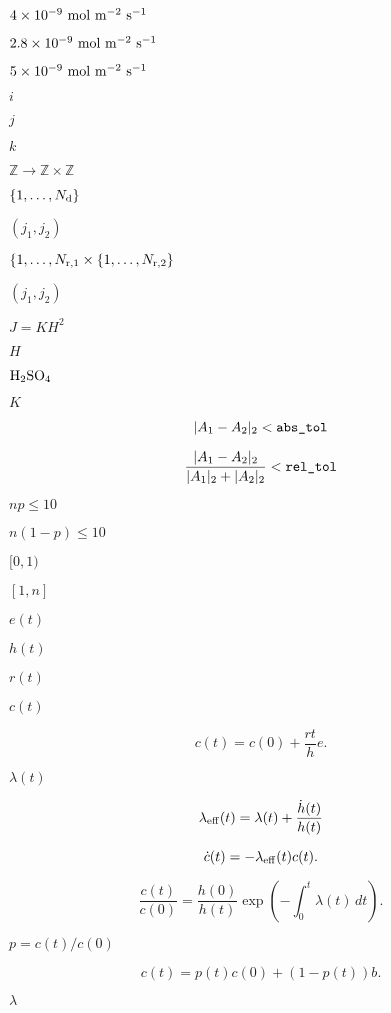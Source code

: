 \documentclass{article}
\begin{document}
$4\times
 10^{-9}\rm\ mol\ m^{-2}\ s^{-1}$
\pagebreak

$2.8\times
 10^{-9}\rm\ mol\ m^{-2}\ s^{-1}$
\pagebreak

$5\times
 10^{-9}\rm\ mol\ m^{-2}\ s^{-1}$
\pagebreak

$i$
\pagebreak

$j$
\pagebreak

$k$
\pagebreak

$\mathbb{Z} \to \mathbb{Z} \times \mathbb{Z}$
\pagebreak

$\{1,
 \ldots, N_{\rm d}\}$
\pagebreak

$(j_1,j_2)$
\pagebreak

$\{1, \ldots, N_{\rm r,1} \times \{1, \ldots, N_{\rm
 r,2}\}$
\pagebreak

$(j_1, j_2)$
\pagebreak

$ J = K H^2 $
\pagebreak

$H$
\pagebreak

$ \rm H_2SO_4 $
\pagebreak

$K$
\pagebreak

\[ | A_1 - A_2 |_2 < \verb+abs_tol+ \]
\pagebreak

\[ \frac{| A_1 - A_2 |_2}{| A_1 |_2 + | A_2 |_2}
           < \verb+rel_tol+ \]
\pagebreak

$np \le 10$
\pagebreak

$n(1-p) \le 10$
\pagebreak

$[0,1)$
\pagebreak

$[1,n]$
\pagebreak

$e(t)$
\pagebreak

$h(t)$
\pagebreak

$r(t)$
\pagebreak

$c(t)$
\pagebreak

\[
     c(t) = c(0) + \frac{r t}{h} e.
 \]
\pagebreak

$\lambda(t)$
\pagebreak

\[
     \lambda_{\rm eff}(t) = \lambda(t) + \frac{\dot{h}(t)}{h(t)}
 \]
\pagebreak

\[
     \dot{c}(t) = - \lambda_{\rm eff}(t) c(t).
 \]
\pagebreak

\[
     \frac{c(t)}{c(0)} = \frac{h(0)}{h(t)}
                         \exp\left( - \int_0^t \lambda(t)\,dt\right).
 \]
\pagebreak

$p = c(t)/c(0)$
\pagebreak

\[
     c(t) = p(t) c(0) + (1 - p(t)) b.
 \]
\pagebreak

$\lambda$
\pagebreak
\end{document}

